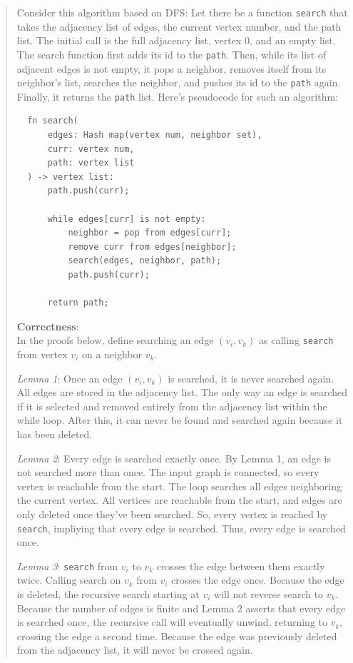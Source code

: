 \documentclass[11pt]{article}
\begin{document}
\begin{enumerate}
\begin{enumerate}
\begin{quote}
      \medskip
      Consider this algorithm based on DFS: Let there be a function \texttt{search} that takes the adjacency list of edges, the current vertex number, and the path list. The initial call is the full adjacency list, vertex 0, and an empty list. The search function first adds its id to the \texttt{path}. Then, while its list of adjacent edges is not empty, it pops a neighbor, removes itself from its neighbor's list, searches the neighbor, and pushes its id to the \texttt{path} again. Finally, it returns the \texttt{path} list. Here's pseudocode for such an algorithm: 

  \begin{verbatim}
  fn search(
      edges: Hash map(vertex num, neighbor set), 
      curr: vertex num, 
      path: vertex list
  ) -> vertex list:
      path.push(curr);

      while edges[curr] is not empty:
          neighbor = pop from edges[curr];
          remove curr from edges[neighbor];
          search(edges, neighbor, path);
          path.push(curr);

      return path;
  \end{verbatim}

  \textbf{Correctness}: \\
  In the proofs below, define searching an edge $(v_i, v_k)$ as calling \texttt{search} from vertex $v_i$ on a neighbor $v_k$.

  \medskip
  \textit{Lemma 1}: Once an edge $(v_i, v_k)$ is searched, it is never searched again. All edges are stored in the adjacency list. The only way an edge is searched if it is selected and removed entirely from the adjacency list within the while loop. After this, it can never be found and searched again because it has been deleted.

  \medskip
  \textit{Lemma 2}: Every edge is searched exactly once. By Lemma 1, an edge is not searched more than once. The input graph is connected, so every vertex is reachable from the start. The loop searches all edges neighboring the current vertex. All vertices are reachable from the start, and edges are only deleted once they've been searched. So, every vertex is reached by \texttt{search}, impliying that every edge is searched. Thus, every edge is searched once.

  \medskip
  \textit{Lemma 3}: \texttt{search} from $v_i$ to $v_k$ crosses the edge between them exactly twice. Calling search on $v_k$ from $v_i$ crosses the edge once. Because the edge is deleted, the recursive search starting at $v_i$ will not reverse search to $v_k$. Because the number of edges is finite and Lemma 2 asserts that every edge is searched once, the recursive call will eventually unwind, returning to $v_k$, crossing the edge a second time. Because the edge was previously deleted from the adjacency list, it will never be crossed again. 
      

\end{quote}
\end{enumerate}
\end{enumerate}
\end{document}
